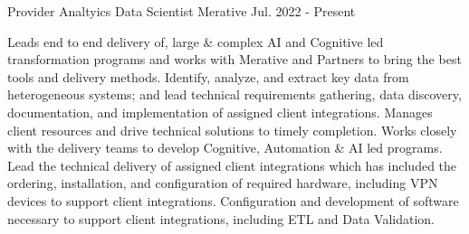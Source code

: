 

\begin{cventries}

  \cventry
    {Provider Analtyics}
    {Data Scientist} %
    {Merative}
    {Jul. 2022 - Present}
    {
      \begin{cvcompactparagraph}
        Leads end to end delivery of, large \& complex AI and Cognitive led transformation programs and works with Merative and Partners to bring the best tools and delivery methods.  Identify, analyze, and extract key data from heterogeneous systems; and lead technical requirements gathering, data discovery, documentation, and implementation of assigned client integrations.  Manages client resources and drive technical solutions to timely completion.  Works closely with the delivery teams to develop Cognitive, Automation \& AI led programs.  Lead the technical delivery of assigned client integrations which has included the ordering, installation, and configuration of required hardware, including VPN devices to support client integrations.  Configuration and development of software necessary to support client integrations, including ETL and Data Validation.
      \end{cvcompactparagraph}
    }


\end{cventries}
